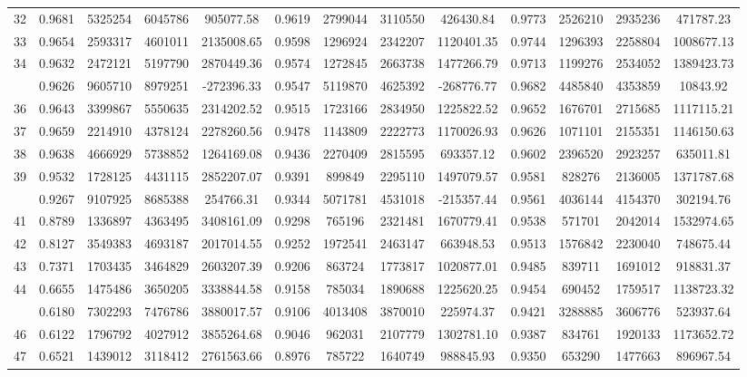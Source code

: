 \documentclass[
  12pt,
]{article}
\begin{document}
\begin{longtable}[t]{lcccccccccccc}
32 & 0.9681 & 5325254 & 6045786 & 905077.58 & 0.9619 & 2799044 & 3110550 & 426430.84 & 0.9773 & 2526210 & 2935236 & 471787.23\\
33 & 0.9654 & 2593317 & 4601011 & 2135008.65 & 0.9598 & 1296924 & 2342207 & 1120401.35 & 0.9744 & 1296393 & 2258804 & 1008677.13\\
34 & 0.9632 & 2472121 & 5197790 & 2870449.36 & 0.9574 & 1272845 & 2663738 & 1477266.79 & 0.9713 & 1199276 & 2534052 & 1389423.73\\
\addlinespace
35 & 0.9626 & 9605710 & 8979251 & -272396.33 & 0.9547 & 5119870 & 4625392 & -268776.77 & 0.9682 & 4485840 & 4353859 & 10843.92\\
36 & 0.9643 & 3399867 & 5550635 & 2314202.52 & 0.9515 & 1723166 & 2834950 & 1225822.52 & 0.9652 & 1676701 & 2715685 & 1117115.21\\
37 & 0.9659 & 2214910 & 4378124 & 2278260.56 & 0.9478 & 1143809 & 2222773 & 1170026.93 & 0.9626 & 1071101 & 2155351 & 1146150.63\\
38 & 0.9638 & 4666929 & 5738852 & 1264169.08 & 0.9436 & 2270409 & 2815595 & 693357.12 & 0.9602 & 2396520 & 2923257 & 635011.81\\
39 & 0.9532 & 1728125 & 4431115 & 2852207.07 & 0.9391 & 899849 & 2295110 & 1497079.57 & 0.9581 & 828276 & 2136005 & 1371787.68\\
\addlinespace
40 & 0.9267 & 9107925 & 8685388 & 254766.31 & 0.9344 & 5071781 & 4531018 & -215357.44 & 0.9561 & 4036144 & 4154370 & 302194.76\\
41 & 0.8789 & 1336897 & 4363495 & 3408161.09 & 0.9298 & 765196 & 2321481 & 1670779.41 & 0.9538 & 571701 & 2042014 & 1532974.65\\
42 & 0.8127 & 3549383 & 4693187 & 2017014.55 & 0.9252 & 1972541 & 2463147 & 663948.53 & 0.9513 & 1576842 & 2230040 & 748675.44\\
43 & 0.7371 & 1703435 & 3464829 & 2603207.39 & 0.9206 & 863724 & 1773817 & 1020877.01 & 0.9485 & 839711 & 1691012 & 918831.37\\
44 & 0.6655 & 1475486 & 3650205 & 3338844.58 & 0.9158 & 785034 & 1890688 & 1225620.25 & 0.9454 & 690452 & 1759517 & 1138723.32\\
\addlinespace
45 & 0.6180 & 7302293 & 7476786 & 3880017.57 & 0.9106 & 4013408 & 3870010 & 225974.37 & 0.9421 & 3288885 & 3606776 & 523937.64\\
46 & 0.6122 & 1796792 & 4027912 & 3855264.68 & 0.9046 & 962031 & 2107779 & 1302781.10 & 0.9387 & 834761 & 1920133 & 1173652.72\\
47 & 0.6521 & 1439012 & 3118412 & 2761563.66 & 0.8976 & 785722 & 1640749 & 988845.93 & 0.9350 & 653290 & 1477663 & 896967.54\\

\end{longtable}
\end{document}
